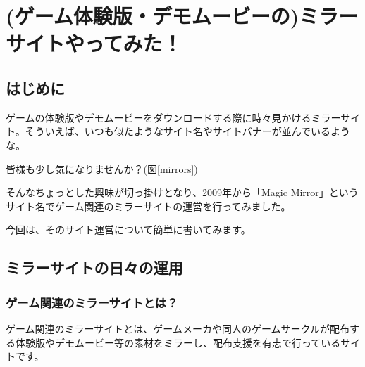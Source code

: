 \chapter{(ゲーム体験版・デモムービーの)ミラーサイトやってみた！}

 

\section{はじめに}

ゲームの体験版やデモムービーをダウンロードする際に時々見かけるミラーサイト。そういえば、いつも似たようなサイト名やサイトバナーが並んでいるような。%

皆様も少し気になりませんか？(図\ref{mirrors})

 

そんなちょっとした興味が切っ掛けとなり、2009年から「Magic Mirror」というサイト名でゲーム関連のミラーサイトの運営を行ってみました。\cite{MagicMirror}%

今回は、そのサイト運営について簡単に書いてみます。

 

\section{ミラーサイトの日々の運用}






 

\subsection{ゲーム関連のミラーサイトとは？}

ゲーム関連のミラーサイトとは、ゲームメーカや同人のゲームサークルが配布する体験版やデモムービー等の素材をミラーし、配布支援を有志で行っているサイトです。

